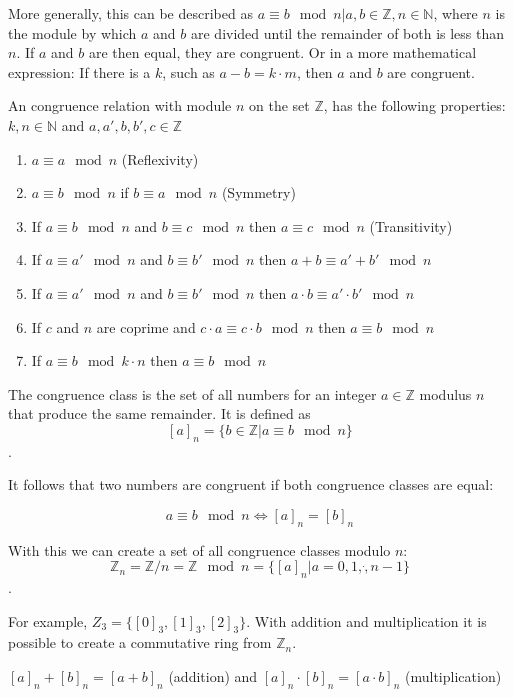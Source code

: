 More generally, this can be described as $a \equiv b \mod n | a,b \in \mathbb{Z}, n \in \mathbb{N}$, where $n$ is the module by which $a$ and $b$ are divided until the remainder of both is less than $n$. If $a$ and $b$ are then equal, they are congruent. Or in a more mathematical expression: If there is a $k$, such as $a-b = k\cdot m$, then $a$ and $b$ are congruent.

An congruence relation with module $n$ on the set $\mathbb{Z}$, has the following properties:
$k,n \in \mathbb{N}$ and $a, a', b, b', c \in \mathbb{Z}$
\begin{enumerate}
  \item $a \equiv a \mod n$ (Reflexivity)
  \item $a \equiv b \mod n$ if $b \equiv a \mod n$ (Symmetry)
  \item If $a \equiv b \mod n$ and $b \equiv c \mod n$ then $a \equiv c \mod n$ (Transitivity)
  \item If $a \equiv a' \mod n$ and $b \equiv b' \mod n$ then $a+b \equiv a'+b' \mod n$
  \item If $a \equiv a' \mod n$ and $b \equiv b' \mod n$ then $a\cdot b \equiv a'\cdot b' \mod n$
  \item If $c$ and $n$ are coprime and $c \cdot a \equiv c \cdot b \mod n$ then $a \equiv b \mod n$
  \item If $a \equiv b \mod k\cdot n$ then $a \equiv b \mod n$
\end{enumerate}

The congruence class is the set of all numbers for an integer $a \in \mathbb{Z}$ modulus $n$ that produce the same remainder. It is defined as
$$[a]_n = \{b \in \mathbb{Z} | a \equiv b \mod n\}$$.

It follows that two numbers are congruent if both congruence classes are equal:

$$a \equiv b \mod n \Leftrightarrow [a]_n = [b]_n$$

With this we can create a set of all congruence classes modulo $n$:
$$\mathbb{Z}_n = \mathbb{Z}/n = \mathbb{Z} \mod n = \{[a]_n | a = 0, 1, \dot, n-1 \}$$.

For example, $Z_3 = \{[0]_3, [1]_3, [2]_3\}$. With addition and multiplication it is possible to create a commutative ring from $\mathbb{Z}_n$.
\begin{center}
  $[a]_n + [b]_n = [a+b]_n$ (addition) and $[a]_n \cdot [b]_n = [a\cdot b]_n$ (multiplication)
\end{center}

